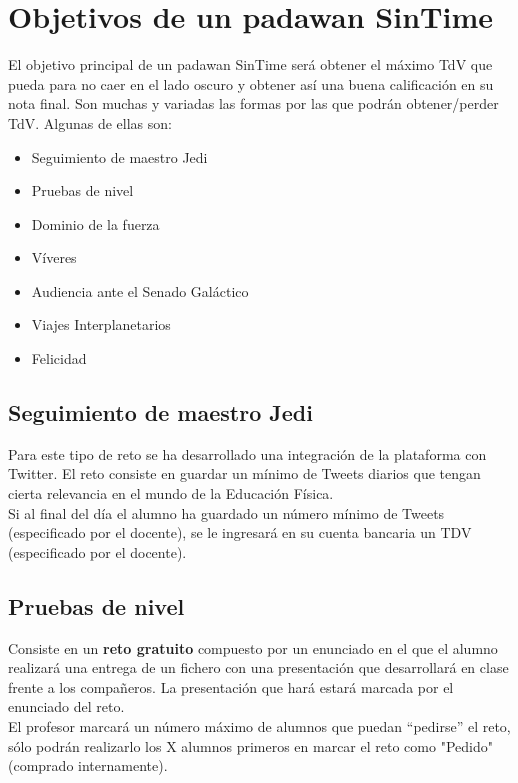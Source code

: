\section{Objetivos de un padawan SinTime}

El objetivo principal de un padawan SinTime será obtener el máximo TdV que pueda para no caer en el lado oscuro y obtener así una buena calificación en su nota final. Son muchas y variadas las formas por las que podrán obtener/perder TdV. Algunas de ellas son:

\begin{itemize}
	\item Seguimiento de maestro Jedi
	\item Pruebas de nivel
	\item Dominio de la fuerza
	\item Víveres
	\item Audiencia ante el Senado Galáctico
	\item Viajes Interplanetarios
	\item Felicidad
\end{itemize}

\subsection{Seguimiento de maestro Jedi}
Para este tipo de reto se ha desarrollado una integración de la plataforma con Twitter. El reto consiste en guardar un mínimo de Tweets diarios que tengan cierta relevancia en el mundo de la Educación Física.\\

Si al final del día el alumno ha guardado un número mínimo de Tweets (especificado por el docente), se le ingresará en su cuenta bancaria un TDV (especificado por el docente).

\subsection{Pruebas de nivel}
Consiste en un \textbf{reto gratuito} compuesto por un enunciado en el que el alumno realizará una entrega de un fichero con una presentación que desarrollará en clase frente a los compañeros. La presentación que hará estará marcada por el enunciado del reto.\\

El profesor marcará un número máximo de alumnos que puedan ``pedirse'' el reto, sólo podrán realizarlo los X alumnos primeros en marcar el reto como "Pedido" (comprado internamente).

